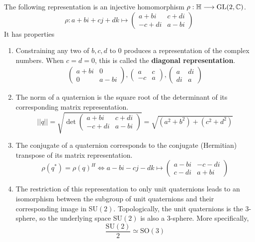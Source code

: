     \begin{proposition}
      The following representation is an injective homomorphism $\rho: \mathbb{H} \longrightarrow \GL(2, \mathbb{C})$. 
      \begin{equation}
        \rho: a + bi + cj + dk \mapsto \begin{pmatrix}
        a+bi & c+ di \\ -c + di & a - bi
        \end{pmatrix}
      \end{equation}
      It has properties
      \begin{enumerate}
        \item Constraining any two of $b, c, d$ to $0$ produces a representation of the complex numbers. When $c = d = 0$, this is called the \textbf{diagonal representation}. 
        \begin{align*}
          \begin{pmatrix}
          a+bi & 0 \\ 0 & a-bi
          \end{pmatrix},  \begin{pmatrix}
          a & c \\ -c & a
          \end{pmatrix},  \begin{pmatrix}
          a & di \\ di & a
          \end{pmatrix}
        \end{align*}
        \item The norm of a quaternion is the square root of the determinant of its corresponding matrix representation. 
          \begin{equation}
            ||q|| = \sqrt{\det \begin{pmatrix}
            a+bi & c+di \\ -c+di & a-bi
            \end{pmatrix}} = \sqrt{(a^2 + b^2) + (c^2 + d^2)}
          \end{equation}
        \item The conjugate of a quaternion corresponds to the conjugate (Hermitian) transpose of its matrix representation. 
          \begin{equation}
            \rho(q^*) = \rho(q)^H \iff a-bi-cj-dk \mapsto \begin{pmatrix}
            a-bi & -c-di \\ c-di & a+bi
            \end{pmatrix}
          \end{equation}
        \item The restriction of this representation to only unit quaternions leads to an isomorphism between the subgroup of unit quaternions and their corresponding image in SU$(2)$. Topologically, the unit quaternions is the $3$-sphere, so the underlying space SU$(2)$ is also a $3$-sphere. More specifically, 
          \begin{equation}
            \frac{\text{SU}(2)}{2} \simeq \text{SO}(3)
          \end{equation}
      \end{enumerate}
    \end{proposition}

